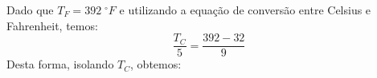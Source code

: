 %
%
	Dado que $T_{F}=392\;^\circ F$ e utilizando a equação de conversão entre Celsius e Fahrenheit, temos: \[\dfrac{T_{C}}{5}=\dfrac{392-32}{9}\] Desta forma, isolando $T_{C}$, obtemos: 
